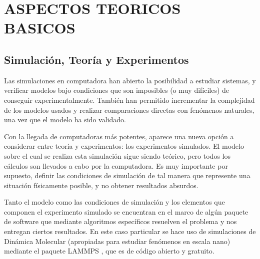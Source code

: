 
\chapter{ASPECTOS TEORICOS BASICOS} %

\label{C2} %



\section{Simulación, Teoría y Experimentos}
\label{S2_1}

Las simulaciones en computadora han abierto la posibilidad a estudiar sistemas, y verificar modelos bajo condiciones que son imposibles (o muy difíciles) de conseguir experimentalmente. También han permitido incrementar la complejidad de los modelos usados y realizar comparaciones directas con fenómenos naturales, una vez que el modelo ha sido validado.

Con la llegada de computadoras más potentes, aparece una nueva opción a considerar entre teoría y experimentos: los experimentos simulados. El modelo sobre el cual se realiza esta simulación sigue siendo teórico, pero todos los cálculos son llevados a cabo por la computadora. Es muy importante por supuesto, definir las condiciones de simulación de tal manera que represente una situación físicamente posible, y no obtener resultados absurdos.

Tanto el modelo como las condiciones de simulación y los elementos que componen el experimento simulado se encuentran en el marco de algún paquete de software que mediante algoritmos específicos resuelven el problema y nos entregan ciertos resultados. En este caso particular se hace uso de simulaciones de Dinámica Molecular (apropiadas para estudiar fenómenos en escala nano) mediante el paquete LAMMPS \citep{plimpton95}, que es de código abierto y gratuito.


